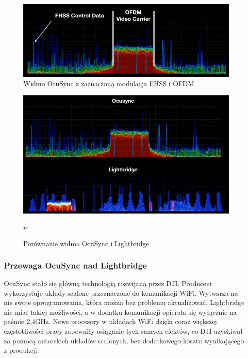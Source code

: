 \begin{figure}[!htbp]
\centering
\includegraphics[width=14cm]{./Obrazy/ocusync_spectrum_2.png}
\caption{Widmo OcuSync z zaznaczoną modulacja FHSS i OFDM}
\end{figure}


\begin{figure}[!htbp]
\centering
\includegraphics[width=14cm]{./Obrazy/ocusync_vs_lightbridge.png}
\caption{Porównanie widma OcuSync i Lightbridge}
v
\end{figure}

\newpage

\subsubsection{Przewaga OcuSync nad Lightbridge}
OcuSync stało się główną technologią rozwijaną przez DJI. Producent wykorzystuje układy scalone przeznaczone do komunikacji WiFi. Wytwarza na nie swoje oprogramowania, która można bez problemu aktualizować. Lightbridge nie miał takiej możliwości, a w dodatku komunikacji opierała się wyłącznie na paśmie 2,4GHz. Nowe procesory w układach WiFi dzięki coraz większej częstotliwości pracy zapewniły osiąganie tych samych efektów, co DJI uzyskiwał za pomocą autorskich układów scalonych, bez dodatkowego kosztu wynikającego z produkcji.

